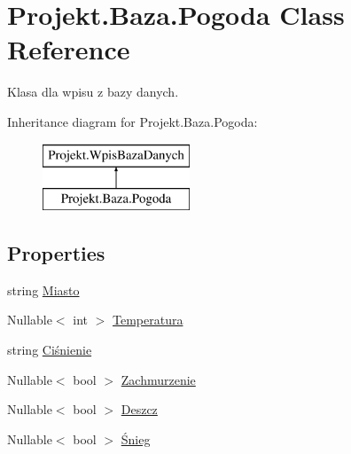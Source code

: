 \hypertarget{class_projekt_1_1_baza_1_1_pogoda}{}\section{Projekt.\+Baza.\+Pogoda Class Reference}
\label{class_projekt_1_1_baza_1_1_pogoda}


Klasa dla wpisu z bazy danych.  


Inheritance diagram for Projekt.\+Baza.\+Pogoda\+:\begin{figure}[H]
\begin{center}
\leavevmode
\includegraphics[height=2.000000cm]{class_projekt_1_1_baza_1_1_pogoda}
\end{center}
\end{figure}
\subsection*{Properties}
\begin{DoxyCompactItemize}
\item 
string \mbox{\hyperlink{class_projekt_1_1_baza_1_1_pogoda_a894027498361636a1c469d09b70b5a21}{Miasto}}
\item 
Nullable$<$ int $>$ \mbox{\hyperlink{class_projekt_1_1_baza_1_1_pogoda_a29cedfe2b1e610ce72ad167b24f2eca0}{Temperatura}}
\item 
string \mbox{\hyperlink{class_projekt_1_1_baza_1_1_pogoda_af0e6f370f2ae20fe77fe6216abaa0da3}{Ciśnienie}}
\item 
Nullable$<$ bool $>$ \mbox{\hyperlink{class_projekt_1_1_baza_1_1_pogoda_a574cf4f942e435d168f7086ea58996b5}{Zachmurzenie}}
\item 
Nullable$<$ bool $>$ \mbox{\hyperlink{class_projekt_1_1_baza_1_1_pogoda_a47313d8e6fb0a248615f3e4067be6082}{Deszcz}}
\item 
Nullable$<$ bool $>$ \mbox{\hyperlink{class_projekt_1_1_baza_1_1_pogoda_acb34c30d93f8087b9a388d796c91a0d1}{Śnieg}}
\end{DoxyCompactItemize}


